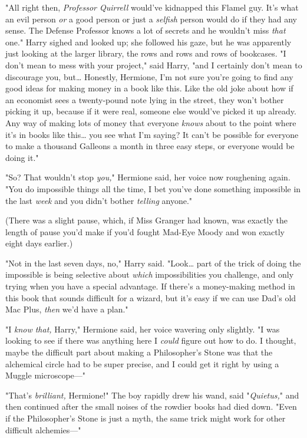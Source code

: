 "All right then, \emph{Professor Quirrell} would've kidnapped this Flamel guy. 
It's what an evil person \emph{or} a good person or just a \emph{selfish} 
person would do if they had any sense. The Defense Professor knows a lot of 
secrets and he wouldn't miss \emph{that} one." Harry sighed and looked up; she 
followed his gaze, but he was apparently just looking at the larger library, 
the rows and rows and rows of bookcases. "I don't mean to mess with your 
project," said Harry, "and I certainly don't mean to discourage you, 
but{\ldots} Honestly, Hermione, I'm not sure you're going to find any good 
ideas for making money in a book like this. Like the old joke about how if an 
economist sees a twenty-pound note lying in the street, they won't bother 
picking it up, because if it were real, someone else would've picked it up 
already. Any way of making lots of money that everyone \emph{knows} about to 
the point where it's in books like this{\ldots} you see what I'm saying? It 
can't be possible for everyone to make a thousand Galleons a month in three 
easy steps, or everyone would be doing it."

"So? That wouldn't stop \emph{you,}" Hermione said, her voice now roughening 
again. "You do impossible things all the time, I bet you've done something 
impossible in the last \emph{week} and you didn't bother \emph{telling} anyone."

(There was a slight pause, which, if Miss Granger had known, was exactly the 
length of pause you'd make if you'd fought Mad-Eye Moody and won exactly eight 
days earlier.)

"Not in the last seven days, no," Harry said. "Look{\ldots} part of the trick 
of doing the impossible is being selective about \emph{which} impossibilities 
you challenge, and only trying when you have a special advantage. If there's a 
money-making method in this book that sounds difficult for a wizard, but it's 
easy if we can use Dad's old Mac Plus, \emph{then} we'd have a plan."

"I \emph{know that,} Harry," Hermione said, her voice wavering only slightly. 
"I was looking to see if there was anything here I \emph{could} figure out how 
to do. I thought, maybe the difficult part about making a Philosopher's Stone 
was that the alchemical circle had to be super precise, and I could get it 
right by using a Muggle microscope---"

"That's \emph{brilliant,} Hermione!" The boy rapidly drew his wand, said 
"\emph{Quietus,}" and then continued after the small noises of the rowdier 
books had died down. "Even if the Philosopher's Stone is just a myth, the same 
trick might work for other difficult alchemies---"

